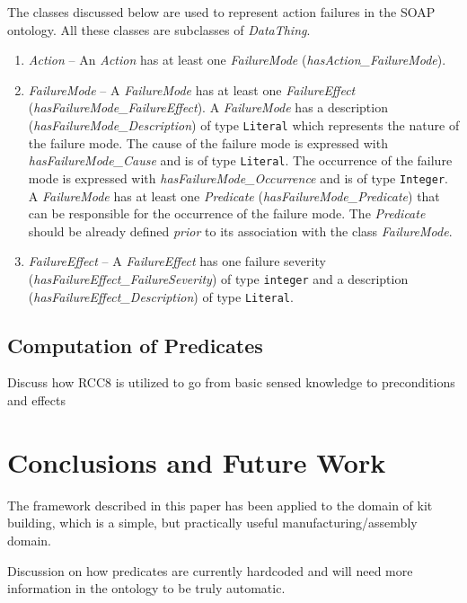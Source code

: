 \documentclass{llncs}
\newcommand{\class}[1] {\textit{#1}}
\begin{document}
The classes discussed below are used to represent action failures in the SOAP ontology. All these classes are subclasses of \class{DataThing}.
\begin{enumerate}
\item \class{Action} -- An \class{Action} has at least one \class{FailureMode} (\emph{hasAction\_FailureMode}).
\item \class{FailureMode} -- A \class{FailureMode} has at least one \class{FailureEffect} (\emph{hasFailureMode\_FailureEffect}). A \class{FailureMode} has a description (\emph{hasFailureMode\_Description}) of type \texttt{Literal} which represents the nature of the failure mode. The cause of the failure mode is expressed with \emph{hasFailureMode\_Cause} and is of type \texttt{Literal}. The occurrence of the failure mode is expressed with \emph{hasFailureMode\_Occurrence} and is of type \texttt{Integer}. A \class{FailureMode} has at least one \class{Predicate} (\emph{hasFailureMode\_Predicate}) that can be responsible for the occurrence of the failure mode. The \class{Predicate} should be already defined \textit{prior} to its association with the class \class{FailureMode}.
\item \class{FailureEffect} -- A \class{FailureEffect} has one failure severity (\emph{hasFailureEffect\_FailureSeverity}) of type \texttt{integer} and a description (\emph{hasFailureEffect\_Description}) of type \texttt{Literal}.
\end{enumerate}
%
\subsection{Computation of Predicates}
\label{sect:computation}
Discuss how RCC8 is utilized to go from basic sensed knowledge to preconditions and effects
%
%
%
\section{Conclusions and Future Work}
\label{sect:future}
The framework described in this paper has been applied to the domain of kit building, which is a simple, but practically useful manufacturing/assembly domain.

Discussion on how predicates are currently hardcoded and will need more information in the ontology to be truly automatic.

%
%


\clearpage
{} %
\renewcommand{\indexname}{Author Index}
\printindex
\clearpage
{} %
\renewcommand{\indexname}{Subject Index}
%
\end{document}

